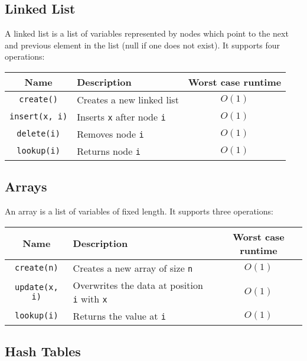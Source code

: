 \documentclass[a4paper, 12pt, twoside]{article}
\begin{document}
\subsection{Linked List}

A linked list is a list of variables represented by nodes which
point to the next and previous element in the list (null if one does
not exist). 
It supports four operations:

\begin{center}
  \begin{tabular}{ || c | p{6.5cm} | c || }
    \hline
    Name & Description & Worst case runtime \\
    \hline
    \texttt{create()} & Creates a new linked list & $O(1)$ \\
    \hline
    \texttt{insert(x, i)} & Inserts \texttt{x} after node \texttt{i} & $O(1)$ \\
    \hline
    \texttt{delete(i)} & Removes node \texttt{i} & $O(1)$ \\
    \hline
    \texttt{lookup(i)} & Returns node \texttt{i} & $O(1)$ \\
    \hline
  \end{tabular}
\end{center}

\subsection{Arrays}

An array is a list of variables of fixed length. 
It supports three operations:

\begin{center}
  \begin{tabular}{ || c | p{6.5cm} | c || }
    \hline
    Name & Description & Worst case runtime \\
    \hline
    \texttt{create(n)} & Creates a new array of size \texttt{n} & $O(1)$ \\
    \hline
    \texttt{update(x, i)} & Overwrites the data at position \texttt{i} with \texttt{x} & $O(1)$ \\
    \hline
    \texttt{lookup(i)} & Returns the value at \texttt{i} & $O(1)$ \\
    \hline
  \end{tabular}
\end{center}

\subsection{Hash Tables}
\end{document}
